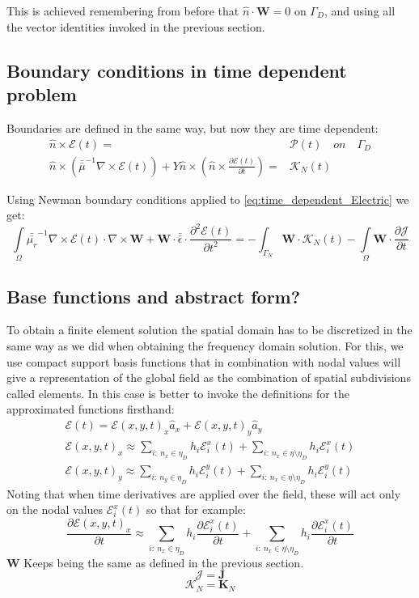 This is achieved remembering from before that $\hat{n}\cdot\mathbf{W} =0$ on $\Gamma_D$, and using all the vector identities invoked in the previous section.

\subsection{Boundary conditions in time dependent problem}
Boundaries are defined in the same way, but now they are time dependent:
\begin{align}
\hat{n}\times\mathcal{E}(t)=&\mathcal{P}(t)\quad on \quad \Gamma_D\\
\hat{n}\times\left(\bar{\bar{\mu}}^{-1}\nabla\times\mathcal{E}(t)
\right)+Y\hat{n}\times\left(\hat{n}\times\frac{\partial\mathcal{E} (t)}{\partial t}\right)=& \mathcal{K}_N(t)
\end{align}

Using Newman boundary conditions applied to \ref{eq:time_dependent_Electric} we get:
\begin{equation}
\int\limits_{\Omega} \bar{\bar{\mu_r}}^{-1}\nabla\times \mathcal{E}(t)\cdot \nabla\times\mathbf{W}
+ \mathbf{W}\cdot\bar{\bar{\epsilon}}\cdot\frac{\partial ^2\mathcal{E}(t)}{\partial t^2}=-\int_{\Gamma_N}\mathbf{W}\cdot\mathcal{K}_N(t)
-\int\limits_{\Omega}\mathbf{W}\cdot\frac{\partial \mathcal{J}}{\partial t} \label{eq:td_weak_form_E_equation}
\end{equation}
\subsection{Base functions and abstract form?}
To obtain a finite element solution the spatial domain has to be discretized in the same way as we did when obtaining the frequency domain solution. For this, we use compact support basis functions that in combination with nodal values will give a representation of the global field as the combination of spatial  subdivisions called elements.
In this case is better to invoke the definitions for the approximated functions firsthand:
\begin{align*}
\mathcal{E}(t)=\mathcal{E}(x,y,t)_x\hat{a}_x + \mathcal{E}(x,y,t)_y \hat{a}_y\\
\mathcal{E}(x,y,t)_x\approx \sum_{i:\ n_x \in \eta_D} h_i \mathcal{E}_i^x(t)+\sum_{i:\ n_x \in \eta\setminus\eta_D} h_i \mathcal{E}_i^x(t)\\
\mathcal{E}(x,y,t)_y\approx \sum_{i:\ n_y \in \eta_D}h_i\mathcal{E}_i^y(t)+
\sum_{i:\ n_x \in \eta\setminus\eta_D}h_i\mathcal{E}_i^y(t)
\end{align*}
Noting that when time derivatives are applied over the field, these will act only on the nodal values $\mathcal{E}_i^x(t)$ so that for example:
$$\frac{\partial \mathcal{E}(x,y,t)_x}{\partial t}\approx \sum_{i:\ n_x \in \eta_D} h_i \frac{\partial \mathcal{E}_i^x(t)}{\partial t}+\sum_{i:\ n_x \in \eta\setminus\eta_D} h_i \frac{\partial\mathcal{E}_i^x(t)}{\partial t}$$
$\mathbf{W}$ Keeps being the same as defined in the previous section.$$\mathcal{J}=\mathbf{J}$$
$$\mathcal{K}_N=\mathbf{K}_N$$

